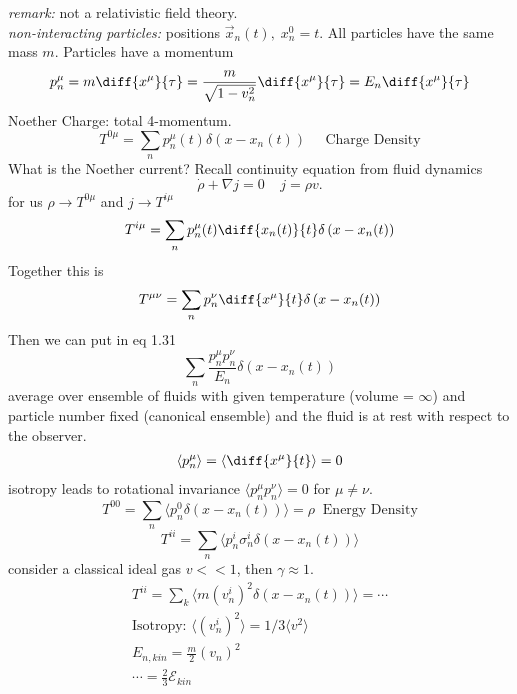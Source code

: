 \textit{remark: }not a relativistic field theory.\\
\textit{non-interacting particles: } positions $\vec x_n(t), \; x_n^0 = t$. All particles have the same mass $m$. Particles have a momentum 
\begin{equation}
	p^\mu_n = m\diff{x^\mu}{\tau} =  \frac{m}{\sqrt{1-v^2_n}}\diff{x^\mu}{\tau} = E_n \diff{x^\mu}{\tau}
\end{equation}
Noether Charge: total 4-momentum.
\begin{equation}
	T^{0\mu} = \sum_n p^\mu_n(t) \delta(x-x_n(t))\;\;\;\;\;\text{Charge Density}
\end{equation}
What is the Noether current? Recall continuity equation from fluid dynamics
\begin{equation}
	\dot\rho + \nabla j = 0\;\;\;\; j = \rho v.
\end{equation}
for us $\rho\rightarrow T^{0\mu}$ and $j\rightarrow T^{i\mu}$
\begin{equation}
	T^{i\mu} = \sum_n p^\mu_n(t) \diff{x_n(t)}{t}\delta\left(x-x_n(t)\right)
\end{equation}
Together this is 
\begin{equation}
	T^{\mu\nu} = \sum_n p_n^\nu \diff{x^\mu}{t}\delta\left(x-x_n(t)\right)
\end{equation}
Then we can put in eq 1.31
\begin{equation}
	\sum_n \frac{p_n^\mu p_n^\nu}{E_n}\delta\left(x-x_n(t)\right)
\end{equation}
average over ensemble of fluids with given temperature (volume = $\infty$) and particle number fixed (canonical ensemble) and the fluid is at rest with respect to the observer.
\begin{gather}
	\langle p_n^\mu\rangle =\langle \diff{x^\mu}{t}\rangle = 0
\end{gather}
isotropy leads to rotational invariance $\langle p^\mu_n p^\nu_n\rangle = 0$ for $\mu\neq \nu$.
\begin{equation}
	T^{00} = \sum_n \langle p_n^0 \delta(x-x_n(t))\rangle = \rho\;\;\text{Energy Density}
\end{equation}
\begin{equation}
	T^{ii} = \sum_n \langle p_n^i \sigma_n^i \delta(x-x_n(t))\rangle
\end{equation}
consider a classical ideal gas $v<<1$, then $\gamma \approx 1$.
\begin{gather}
	T^{ii} = \sum_k \langle m(v^i_n)^2\delta(x-x_n(t))\rangle =  \cdots\\
	\text{Isotropy: } \langle (v^i_n)^2\rangle = 1/3 \langle v^2 \rangle\nonumber\\
	E_{n,kin} = \frac{m}{2}(v_n)^2	\nonumber\\
	\cdots = \frac{2}{3}\mathcal E_{kin}
\end{gather}
